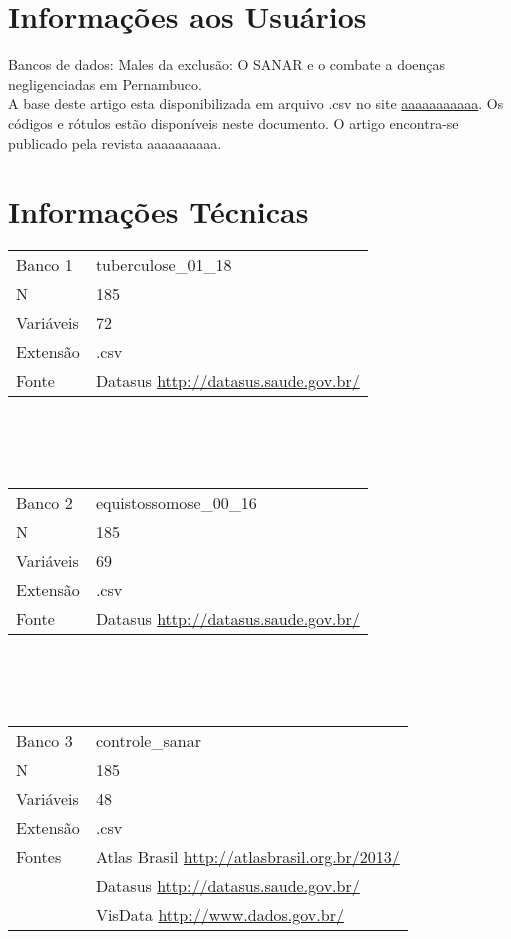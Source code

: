 \documentclass[12pt]{article}
\begin{document}
\tableofcontents
\pagebreak	
	\section{Informações aos Usuários}
	Bancos de dados: Males da exclusão: O SANAR e o combate a doenças
	negligenciadas em Pernambuco. \\
	A base deste artigo esta disponibilizada em arquivo .csv no site {\color{red}\url{aaaaaaaaaaa}}. Os códigos e rótulos estão disponíveis neste documento. O artigo encontra-se publicado pela revista {\color{red}aaaaaaaaaa}.
	\section{Informações Técnicas}
	\begin{tabular}{p{3cm} p{10cm}} 
		Banco 1     & tuberculose\_01\_18 \\
		N           &  185 \\ 
		Variáveis   &  72 \\
		Extensão    & .csv \\  
		Fonte       & Datasus {\color{blue}\url{http://datasus.saude.gov.br/}} \\  
	\end{tabular} \\ \\ \\
	\begin{tabular}{p{3cm} p{10cm}} 
		Banco 2      & equistossomose\_00\_16 \\
		N           &  185 \\ 
		Variáveis   &  69 \\
		Extensão    & .csv \\  
		Fonte       & Datasus {\color{blue}\url{http://datasus.saude.gov.br/}} \\  
	\end{tabular} \\ \\ \\
	\begin{tabular}{p{3cm} p{10cm}} 
		Banco 3     & controle\_sanar \\
		N           &  185 \\ 
		Variáveis   &  48 \\
		Extensão    & .csv \\  
		Fontes      & Atlas Brasil {\color{blue}\url{http://atlasbrasil.org.br/2013/}} \\
		            & Datasus {\color{blue}\url{http://datasus.saude.gov.br/}} \\
		            & VisData {\color{blue}\url{http://www.dados.gov.br/}} \\
		\end{tabular} \\ 
\end{document}
